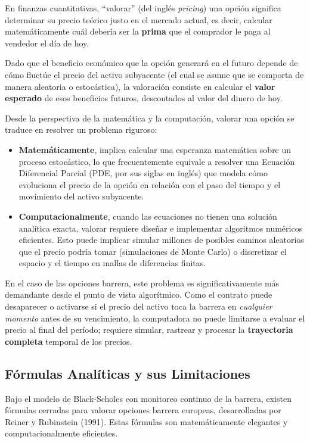 En finanzas cuantitativas, ``valorar'' (del inglés \textit{pricing}) una opción significa determinar su precio teórico justo en el mercado actual, es decir, calcular matemáticamente cuál debería ser la \textbf{prima} que el comprador le paga al vendedor el día de hoy.

Dado que el beneficio económico que la opción generará en el futuro depende de cómo fluctúe el precio del activo subyacente (el cual se asume que se comporta de manera aleatoria o estocástica), la valoración consiste en calcular el \textbf{valor esperado} de esos beneficios futuros, descontados al valor del dinero de hoy.

Desde la perspectiva de la matemática y la computación, valorar una opción se traduce en resolver un problema riguroso:
\begin{itemize}
    \item \textbf{Matemáticamente}, implica calcular una esperanza matemática sobre un proceso estocástico, lo que frecuentemente equivale a resolver una Ecuación Diferencial Parcial (PDE, por sus siglas en inglés) que modela cómo evoluciona el precio de la opción en relación con el paso del tiempo y el movimiento del activo subyacente.
    \item \textbf{Computacionalmente}, cuando las ecuaciones no tienen una solución analítica exacta, valorar requiere diseñar e implementar algoritmos numéricos eficientes. Esto puede implicar simular millones de posibles caminos aleatorios que el precio podría tomar (simulaciones de Monte Carlo) o discretizar el espacio y el tiempo en mallas de diferencias finitas.
\end{itemize}

En el caso de las opciones barrera, este problema es significativamente más demandante desde el punto de vista algorítmico. Como el contrato puede desaparecer o activarse si el precio del activo toca la barrera en \textit{cualquier momento} antes de su vencimiento, la computadora no puede limitarse a evaluar el precio al final del período; requiere simular, rastrear y procesar la \textbf{trayectoria completa} temporal de los precios.

\subsection{Fórmulas Analíticas y sus Limitaciones}

Bajo el modelo de Black-Scholes con monitoreo continuo de la barrera, existen fórmulas cerradas para valorar opciones barrera europeas, desarrolladas por Reiner y Rubinstein (1991). Estas fórmulas son matemáticamente elegantes y computacionalmente eficientes.

